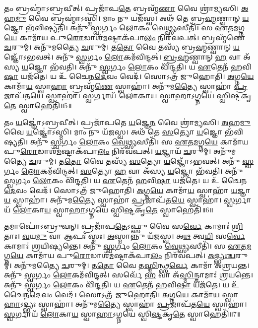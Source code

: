    𑌤𑌂 𑌬𑍍𑌰𑌹𑍍𑌮𑌾॑𑌽𑌬𑍍𑌰𑌵𑍀𑌤𑍍।
   𑌪𑍍𑌰𑌜𑌾᳴𑌪\-\ul{𑌤𑍇} 𑌬𑍍𑌰𑌹𑍍𑌮᳴\-\ul{𑌣𑌾} 𑌵𑍈 𑌶𑍍𑌰𑌾॑𑌮𑍍𑌯𑌸𑌿।
   \ul{𑌅}\-𑌹\-\ul{𑌮𑍁} 𑌵𑍈 𑌬𑍍𑌰𑌹𑍍𑌮𑌾॑𑌽𑌸𑍍𑌮𑌿।
   𑌮𑌾𑌂 𑌨𑍁 𑌯𑌜᳴𑌸𑍍𑌵।
   𑌅𑌥᳴ 𑌤𑍇 𑌬𑍍𑌰\-\ul{𑌹𑍍𑌮}\-\-𑌣𑍍𑌵𑌾𑌨𑍍 \ul{𑌯}\-𑌜𑍍𑌞𑍋 𑌭᳴𑌵𑌿𑌷𑍍𑌯𑌤𑌿।
   𑌅𑌨𑍁᳴ \ul{𑌸𑍍𑌵}\-𑌰𑍍𑌗𑌂 \ul{𑌲𑍋}\-𑌕𑌂 \ul{𑌵𑍇}\-𑌥𑍍𑌸𑍍𑌯𑌸𑍀𑌤𑌿᳴।
   𑌸 \ul{𑌏}\-𑌤\-\ul{𑌮}\-𑌗𑍍𑌨\-\ul{𑌯𑍇} 𑌕𑌾𑌮𑌾᳴𑌯 𑌪𑍁\-\ul{𑌰𑍋}\-𑌡𑌾𑌶᳴\-\ul{𑌮}\-𑌷𑍍𑌟𑌾𑌕᳴𑌪𑌾\-\ul{𑌲𑌂} 𑌨𑌿𑌰᳴𑌵𑌪𑌤𑍍।
   𑌬𑍍𑌰𑌹𑍍𑌮᳴𑌣𑍇 \ul{𑌚}\-𑌰𑍁𑌮𑍍।
   𑌅𑌨𑍁᳴𑌮𑌤𑍍𑌯𑍈 \ul{𑌚}\-𑌰𑍁𑌮𑍍।
   𑌤\-\ul{𑌤𑍋} 𑌵𑍈 𑌤𑌸𑍍𑌯᳴ 𑌬𑍍𑌰\-\ul{𑌹𑍍𑌮}\-\-𑌣𑍍𑌵𑌾𑌨𑍍 \ul{𑌯}\-𑌜𑍍𑌞𑍋᳴𑌽𑌭𑌵𑌤𑍍।
   𑌅𑌨𑍁᳴ \ul{𑌸𑍍𑌵}\-𑌰𑍍𑌗𑌂 \ul{𑌲𑍋}\-𑌕𑌮᳴𑌵𑌿𑌨𑍍𑌦𑌤𑍍।
   \ul{𑌬𑍍𑌰}\-\-\ul{𑌹𑍍𑌮}\-𑌣𑍍𑌵𑌾𑌨𑍍 \ul{𑌹} 𑌵𑌾 𑌅᳴𑌸𑍍𑌯 \ul{𑌯}\-𑌜𑍍𑌞𑍋 𑌭᳴𑌵𑌤𑌿।
   𑌅𑌨𑍁᳴ \ul{𑌸𑍍𑌵}\-𑌰𑍍𑌗𑌂 \ul{𑌲𑍋}\-𑌕𑌂 𑌵𑌿᳴𑌨𑍍𑌦𑌤𑌿।
   𑌯 \ul{𑌏}\-𑌤𑍇𑌨᳴ \ul{𑌹}\-𑌵𑌿\-\ul{𑌷𑌾} 𑌯𑌜᳴𑌤𑍇।
   𑌯 𑌉᳴ 𑌚𑍈𑌨\-\ul{𑌦𑍇}\-𑌵𑌂 𑌵𑍇𑌦᳴।
   𑌸𑍋𑌽𑌤𑍍𑌰᳴ 𑌜𑍁𑌹𑍋𑌤𑌿।
   \ul{𑌅}\-𑌗𑍍𑌨\-\ul{𑌯𑍇} 𑌕𑌾𑌮𑌾᳴\-\ul{𑌯} 𑌸𑍍𑌵𑌾\-\ul{𑌹𑌾} 𑌬𑍍𑌰𑌹𑍍𑌮᳴\-\ul{𑌣𑍇} 𑌸𑍍𑌵𑌾𑌹𑌾॑।
   𑌅𑌨𑍁᳴𑌮\-\ul{𑌤𑍍𑌯𑍈} 𑌸𑍍𑌵𑌾𑌹𑌾॑ \ul{𑌪𑍍𑌰}\-𑌜𑌾𑌪᳴𑌤\-\ul{𑌯𑍇} 𑌸𑍍𑌵𑌾𑌹𑌾॑।
   \ul{𑌸𑍍𑌵}\-𑌰𑍍𑌗𑌾𑌯᳴ \ul{𑌲𑍋}\-𑌕𑌾\-\ul{𑌯} 𑌸𑍍𑌵𑌾\-\ul{𑌹𑌾}\-𑌽𑌗𑍍𑌨𑌯𑍇॑ 𑌸𑍍𑌵𑌿\-\ul{𑌷𑍍𑌟}\-𑌕𑍃\-\ul{𑌤𑍇} 𑌸𑍍𑌵𑌾𑌹𑍇𑌤𑌿᳴॥5॥

   𑌤𑌂 \ul{𑌯}\-𑌜𑍍𑌞𑍋॑𑌽𑌬𑍍𑌰𑌵𑍀𑌤𑍍।
   𑌪𑍍𑌰𑌜𑌾᳴𑌪𑌤𑍇 \ul{𑌯}\-𑌜𑍍𑌞𑍇\-\ul{𑌨} 𑌵𑍈 𑌶𑍍𑌰𑌾॑𑌮𑍍𑌯𑌸𑌿।
   \ul{𑌅}\-𑌹\-\ul{𑌮𑍁} 𑌵𑍈 \ul{𑌯}\-𑌜𑍍𑌞𑍋॑𑌽𑌸𑍍𑌮𑌿।
   𑌮𑌾𑌂 𑌨𑍁 𑌯᳴𑌜𑌸𑍍𑌵।
   𑌅𑌥᳴ 𑌤𑍇 \ul{𑌸}\-𑌤𑍍𑌯𑍋 \ul{𑌯}\-𑌜𑍍𑌞𑍋 𑌭᳴𑌵𑌿𑌷𑍍𑌯𑌤𑌿।
   𑌅𑌨𑍁᳴ \ul{𑌸𑍍𑌵}\-𑌰𑍍𑌗𑌂 \ul{𑌲𑍋}\-𑌕𑌂 \ul{𑌵𑍇}\-𑌥𑍍𑌸𑍍𑌯𑌸𑍀𑌤𑌿᳴।
   𑌸 \ul{𑌏}\-𑌤\-\ul{𑌮}\-𑌗𑍍𑌨\-\ul{𑌯𑍇} 𑌕𑌾𑌮𑌾᳴𑌯 𑌪𑍁\-\ul{𑌰𑍋}\-𑌡𑌾𑌶᳴\-\ul{𑌮}\-𑌷𑍍𑌟𑌾𑌕᳴𑌪𑌾\-\ul{𑌲𑌂} 𑌨𑌿𑌰᳴𑌵𑌪𑌤𑍍।
   \ul{𑌯}\-𑌜𑍍𑌞𑌾𑌯᳴ \ul{𑌚}\-𑌰𑍁𑌮𑍍।
   𑌅𑌨𑍁᳴𑌮𑌤𑍍𑌯𑍈 \ul{𑌚}\-𑌰𑍁𑌮𑍍।
   𑌤\-\ul{𑌤𑍋} 𑌵𑍈 𑌤𑌸𑍍𑌯᳴ \ul{𑌸}\-𑌤𑍍𑌯𑍋 \ul{𑌯}\-𑌜𑍍𑌞𑍋᳴𑌽𑌭𑌵𑌤𑍍।
   𑌅𑌨𑍁᳴ \ul{𑌸𑍍𑌵}\-𑌰𑍍𑌗𑌂 \ul{𑌲𑍋}\-𑌕𑌮᳴𑌵𑌿𑌨𑍍𑌦𑌤𑍍।
   \ul{𑌸}\-𑌤𑍍𑌯𑍋 \ul{𑌹} 𑌵𑌾 𑌅᳴𑌸𑍍𑌯 \ul{𑌯}\-𑌜𑍍𑌞𑍋 𑌭᳴𑌵𑌤𑌿।
   𑌅𑌨𑍁᳴ \ul{𑌸𑍍𑌵}\-𑌰𑍍𑌗𑌂 \ul{𑌲𑍋}\-𑌕𑌂 𑌵𑌿᳴𑌨𑍍𑌦𑌤𑌿।
   𑌯 \ul{𑌏}\-𑌤𑍇𑌨᳴ \ul{𑌹}\-𑌵𑌿\-\ul{𑌷𑌾} 𑌯𑌜᳴𑌤𑍇।
   𑌯 𑌉᳴ 𑌚𑍈𑌨\-\ul{𑌦𑍇}\-𑌵𑌂 𑌵𑍇𑌦᳴।
   𑌸𑍋𑌽𑌤𑍍𑌰᳴ 𑌜𑍁𑌹𑍋𑌤𑌿।
   \ul{𑌅}\-𑌗𑍍𑌨\-\ul{𑌯𑍇} 𑌕𑌾𑌮𑌾᳴\-\ul{𑌯} 𑌸𑍍𑌵𑌾𑌹𑌾᳴ \ul{𑌯}\-𑌜𑍍𑌞𑌾\-\ul{𑌯} 𑌸𑍍𑌵𑌾𑌹𑌾॑।
   𑌅𑌨𑍁᳴𑌮\-\ul{𑌤𑍍𑌯𑍈} 𑌸𑍍𑌵𑌾𑌹𑌾॑ \ul{𑌪𑍍𑌰}\-𑌜𑌾𑌪᳴𑌤\-\ul{𑌯𑍇} 𑌸𑍍𑌵𑌾𑌹𑌾॑।
   \ul{𑌸𑍍𑌵}\-𑌰𑍍𑌗𑌾𑌯᳴ \ul{𑌲𑍋}\-𑌕𑌾\-\ul{𑌯} 𑌸𑍍𑌵𑌾\-\ul{𑌹𑌾}\-𑌽𑌗𑍍𑌨𑌯𑍇॑ 𑌸𑍍𑌵𑌿\-\ul{𑌷𑍍𑌟}\-𑌕𑍃\-\ul{𑌤𑍇} 𑌸𑍍𑌵𑌾𑌹𑍇𑌤𑌿᳴॥6॥

   𑌤𑌮𑌾𑌪𑍋॑𑌽𑌬𑍍𑌰𑍁𑌵𑌨𑍍।
   𑌪𑍍𑌰𑌜𑌾᳴𑌪\-\ul{𑌤𑍇}\-𑌽𑌫𑍍𑌸𑍁 𑌵𑍈 𑌸\-\ul{𑌰𑍍𑌵𑍇} 𑌕𑌾𑌮𑌾𑌃॑ \ul{𑌶𑍍𑌰𑌿}\-𑌤𑌾𑌃।
   \ul{𑌵}\-𑌯\-\ul{𑌮𑍁} 𑌵𑌾 𑌆𑌪𑌃᳴ 𑌸𑍍𑌮𑌃।
   \ul{𑌅}\-𑌸𑍍𑌮𑌾𑌨𑍍𑌨𑍁 𑌯᳴𑌜𑌸𑍍𑌵।
   𑌅\-\ul{𑌥} 𑌤𑍍𑌵\-\ul{𑌯𑌿} 𑌸\-\ul{𑌰𑍍𑌵𑍇} 𑌕𑌾𑌮𑌾𑌃॑ 𑌶𑍍𑌰𑌯𑌿𑌷𑍍𑌯𑌨𑍍𑌤𑍇।
   𑌅𑌨𑍁᳴ \ul{𑌸𑍍𑌵}\-𑌰𑍍𑌗𑌂 \ul{𑌲𑍋}\-𑌕𑌂 \ul{𑌵𑍇}\-𑌥𑍍𑌸𑍍𑌯𑌸𑍀𑌤𑌿᳴।
   𑌸 \ul{𑌏}\-𑌤\-\ul{𑌮}\-𑌗𑍍𑌨\-\ul{𑌯𑍇} 𑌕𑌾𑌮𑌾᳴𑌯 𑌪𑍁\-\ul{𑌰𑍋}\-𑌡𑌾𑌶᳴\-\ul{𑌮}\-𑌷𑍍𑌟𑌾𑌕᳴𑌪𑌾\-\ul{𑌲𑌂} 𑌨𑌿𑌰᳴𑌵𑌪𑌤𑍍।
   \ul{𑌅}\-𑌦𑍍𑌭𑍍𑌯\-\ul{𑌶𑍍𑌚}\-𑌰𑍁𑌮𑍍।
   𑌅𑌨𑍁᳴𑌮𑌤𑍍𑌯𑍈 \ul{𑌚}\-𑌰𑍁𑌮𑍍।
   𑌤\-\ul{𑌤𑍋} 𑌵𑍈 𑌤\-\ul{𑌸𑍍𑌮𑌿}\-𑌨𑍍𑌥𑍍𑌸\-\ul{𑌰𑍍𑌵𑍇} 𑌕𑌾𑌮𑌾᳴ 𑌅𑌶𑍍𑌰𑌯𑌨𑍍𑌤।
   𑌅𑌨𑍁᳴ \ul{𑌸𑍍𑌵}\-𑌰𑍍𑌗𑌂 \ul{𑌲𑍋}\-𑌕𑌮᳴𑌵𑌿𑌨𑍍𑌦𑌤𑍍।
   𑌸𑌰𑍍𑌵𑍇᳴ \ul{𑌹} 𑌵𑌾 𑌅᳴\-\ul{𑌸𑍍𑌮𑌿}\-𑌨𑍍𑌕𑌾𑌮𑌾𑌃॑ 𑌶𑍍𑌰𑌯𑌨𑍍𑌤𑍇।
   𑌅𑌨𑍁᳴ \ul{𑌸𑍍𑌵}\-𑌰𑍍𑌗𑌂 \ul{𑌲𑍋}\-𑌕𑌂 𑌵𑌿᳴𑌨𑍍𑌦𑌤𑌿।
   𑌯 \ul{𑌏}\-𑌤𑍇𑌨᳴ \ul{𑌹}\-𑌵𑌿\-\ul{𑌷𑌾} 𑌯𑌜᳴𑌤𑍇।
   𑌯 𑌉᳴ 𑌚𑍈𑌨\-\ul{𑌦𑍇}\-𑌵𑌂 𑌵𑍇𑌦᳴।
   𑌸𑍋𑌽𑌤𑍍𑌰᳴ 𑌜𑍁𑌹𑍋𑌤𑌿।
   \ul{𑌅}\-𑌗𑍍𑌨\-\ul{𑌯𑍇} 𑌕𑌾𑌮𑌾᳴\-\ul{𑌯} 𑌸𑍍𑌵𑌾\-\ul{𑌹𑌾}\-𑌽𑌦𑍍𑌭𑍍𑌯𑌃 𑌸𑍍𑌵𑌾𑌹𑌾॑।
   𑌅𑌨𑍁᳴𑌮\-\ul{𑌤𑍍𑌯𑍈} 𑌸𑍍𑌵𑌾𑌹𑌾॑ \ul{𑌪𑍍𑌰}\-𑌜𑌾𑌪᳴𑌤\-\ul{𑌯𑍇} 𑌸𑍍𑌵𑌾𑌹𑌾॑।
   \ul{𑌸𑍍𑌵}\-𑌰𑍍𑌗𑌾𑌯᳴ \ul{𑌲𑍋}\-𑌕𑌾\-\ul{𑌯} 𑌸𑍍𑌵𑌾\-\ul{𑌹𑌾}\-𑌽𑌗𑍍𑌨𑌯𑍇॑ 𑌸𑍍𑌵𑌿\-\ul{𑌷𑍍𑌟}\-𑌕𑍃\-\ul{𑌤𑍇} 𑌸𑍍𑌵𑌾𑌹𑍇𑌤𑌿᳴॥7॥

